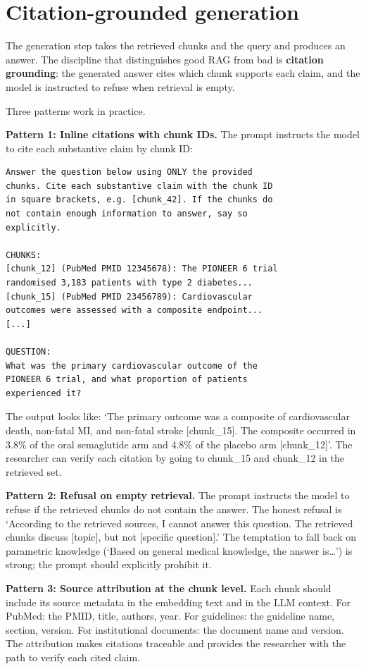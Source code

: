 \documentclass[
  letterpaper,
  11pt]{scrbook}
\begin{document}
\section{Citation-grounded
generation}\label{citation-grounded-generation}

The generation step takes the retrieved chunks and the query and
produces an answer. The discipline that distinguishes good RAG from bad
is \textbf{citation grounding}: the generated answer cites which chunk
supports each claim, and the model is instructed to refuse when
retrieval is empty.

Three patterns work in practice.

\textbf{Pattern 1: Inline citations with chunk IDs.} The prompt
instructs the model to cite each substantive claim by chunk ID:

\begin{verbatim}
Answer the question below using ONLY the provided
chunks. Cite each substantive claim with the chunk ID
in square brackets, e.g. [chunk_42]. If the chunks do
not contain enough information to answer, say so
explicitly.

CHUNKS:
[chunk_12] (PubMed PMID 12345678): The PIONEER 6 trial
randomised 3,183 patients with type 2 diabetes...
[chunk_15] (PubMed PMID 23456789): Cardiovascular
outcomes were assessed with a composite endpoint...
[...]

QUESTION:
What was the primary cardiovascular outcome of the
PIONEER 6 trial, and what proportion of patients
experienced it?
\end{verbatim}

The output looks like: `The primary outcome was a composite of
cardiovascular death, non-fatal MI, and non-fatal stroke
{[}chunk\_15{]}. The composite occurred in 3.8\% of the oral semaglutide
arm and 4.8\% of the placebo arm {[}chunk\_12{]}'. The researcher can
verify each citation by going to chunk\_15 and chunk\_12 in the
retrieved set.

\textbf{Pattern 2: Refusal on empty retrieval.} The prompt instructs the
model to refuse if the retrieved chunks do not contain the answer. The
honest refusal is `According to the retrieved sources, I cannot answer
this question. The retrieved chunks discuss {[}topic{]}, but not
{[}specific question{]}.' The temptation to fall back on parametric
knowledge (`Based on general medical knowledge, the answer is\ldots{}')
is strong; the prompt should explicitly prohibit it.

\textbf{Pattern 3: Source attribution at the chunk level.} Each chunk
should include its source metadata in the embedding text and in the LLM
context. For PubMed: the PMID, title, authors, year. For guidelines: the
guideline name, section, version. For institutional documents: the
document name and version. The attribution makes citations traceable and
provides the researcher with the path to verify each cited claim.
\end{document}
